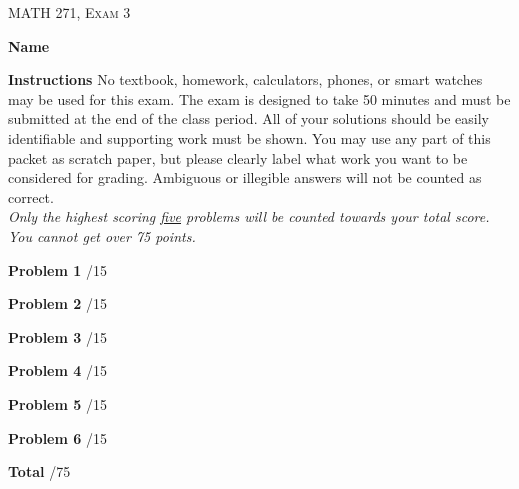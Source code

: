 \documentclass[12pt]{amsbook}
\begin{document}

\begin{center}
   \textsc{\large MATH 271, Exam 3}\\
\end{center}
\vspace{1cm}

\noindent\textbf{Name} \; \underline{\hspace{8cm}}

\vspace{1cm}

\noindent\textbf{Instructions} \; No textbook, homework, calculators, phones, or smart watches may be used for this exam. The exam is designed to take 50 minutes and must be submitted at the end of the class period. All of your solutions should be easily identifiable and supporting work must be shown. You may use any part of this packet as scratch paper, but please clearly label what work you want to be considered for grading. Ambiguous or illegible answers will not be counted as correct.\\

\noindent\emph{Only the highest scoring \underline{five} problems will be counted towards your total score. You cannot get over 75 points.}

\vspace{1cm}

\begin{flushleft}
\textbf{Problem 1} \; \underline{\hspace{1cm}}/15

\vspace{.25cm}

\textbf{Problem 2} \; \underline{\hspace{1cm}}/15

\vspace{.25cm}

\textbf{Problem 3} \; \underline{\hspace{1cm}}/15

\vspace{.25cm}

\textbf{Problem 4} \; \underline{\hspace{1cm}}/15

\vspace{.25cm}

\textbf{Problem 5} \; \underline{\hspace{1cm}}/15

\vspace{.25cm}

\textbf{Problem 6} \; \underline{\hspace{1cm}}/15

\vspace{.5cm}

\textbf{Total} \;\hspace{1.1cm} \underline{\hspace{1.25cm}}/75
\end{flushleft}
\end{document}
